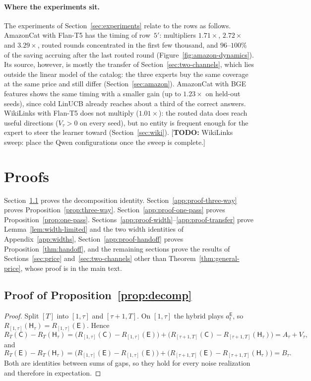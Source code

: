 \documentclass{article}
\theoremstyle{definition}
\theoremstyle{remark}
\theoremstyle{remark}
\newcommand{\todo}[1]{\textcolor{red!70!black}{[\textbf{TODO:} #1]}}
\newcommand{\Cold}{\mathsf{C}}
\newcommand{\Exp}{\mathsf{E}}
\newcommand{\Hyb}{\mathsf{H}}
\begin{document}
\paragraph{Where the experiments sit.}
The experiments of Section~\ref{sec:experiments} relate to the rows as
follows. AmazonCat with Flan-T5 has the timing of row~$5'$: multipliers
$1.71\times$, $2.72\times$ and $3.29\times$, routed rounds concentrated in the
first few thousand, and $96$--$100\%$ of the saving accruing after the last
routed round (Figure~\ref{fig:amazon-dynamics}). Its source, however, is
mostly the transfer of Section~\ref{sec:two-channels}, which lies outside the
linear model of the catalog: the three experts buy the same coverage at the
same price and still differ (Section~\ref{sec:amazon}). AmazonCat with BGE
features shows the same timing with a smaller gain (up to $1.23\times$ on
held-out seeds), since cold LinUCB already reaches about a third of the
correct answers. WikiLinks with Flan-T5 does not multiply ($1.01\times$): the
routed data does reach useful directions ($V_\tau>0$ on every seed), but no
entity is frequent enough for the expert to steer the learner toward
(Section~\ref{sec:wiki}). \todo{WikiLinks sweep: place the Qwen
configurations once the sweep is complete.}

\section{Proofs}
\label{app:proofs}

Section~\ref{app:proof-decomp} proves the decomposition identity.
Section~\ref{app:proof-three-way} proves
Proposition~\ref{prop:three-way}.
Section~\ref{app:proof-one-pass} proves Proposition~\ref{prop:one-pass}.
Sections~\ref{app:proof-width}--\ref{app:proof-transfer} prove
Lemma~\ref{lem:width-limited} and the two width identities of
Appendix~\ref{app:widths}, Section~\ref{app:proof-handoff} proves
Proposition~\ref{thm:handoff}, and the remaining sections prove the results of
Sections~\ref{sec:price} and~\ref{sec:two-channels} other than
Theorem~\ref{thm:general-price}, whose proof is in the main text.

\subsection{Proof of Proposition~\ref{prop:decomp}}
\label{app:proof-decomp}

\begin{proof}
Split $[T]$ into $[1,\tau]$ and $[\tau+1,T]$. On $[1,\tau]$ the hybrid plays
$a_t^{\Exp}$, so $R_{[1,\tau]}(\Hyb_\tau)=R_{[1,\tau]}(\Exp)$. Hence
\[
R_T(\Cold)-R_T(\Hyb_\tau)
=\bigl(R_{[1,\tau]}(\Cold)-R_{[1,\tau]}(\Exp)\bigr)
+\bigl(R_{[\tau+1,T]}(\Cold)-R_{[\tau+1,T]}(\Hyb_\tau)\bigr)
=A_\tau+V_\tau ,
\]
and
\[
R_T(\Exp)-R_T(\Hyb_\tau)
=\bigl(R_{[1,\tau]}(\Exp)-R_{[1,\tau]}(\Exp)\bigr)
+\bigl(R_{[\tau+1,T]}(\Exp)-R_{[\tau+1,T]}(\Hyb_\tau)\bigr)
=B_\tau .
\]
Both are identities between sums of gaps, so they hold for every noise
realization and therefore in expectation.
\end{proof}
\end{document}

